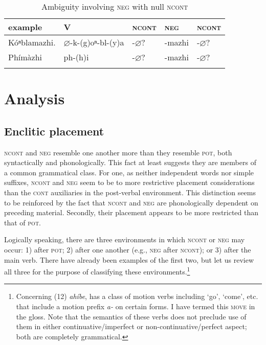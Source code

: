 \documentclass[output=paper]{LSP/langsci}
\begin{document}
\begin{table}
\caption{Ambiguity involving \textsc{neg} with null \textsc{ncont}} \label{tableambiguity}
\begin{tabular}[h!]{ l l l l l }
\lsptoprule
example & V & \textsc{ncont}	& \textsc{neg} & \textsc{ncont} \\
\midrule
Kóⁿblamazhi. & $\varnothing$-k-(g)oⁿ-bl-(y)a & -$\varnothing$? & -mazhi & -$\varnothing$? \\
Phímàzhi & ph-(h)i & -$\varnothing$? &  -mazhi & -$\varnothing$?  \\
\lspbottomrule
\end{tabular}
\end{table}

\section{Analysis}
\subsection{Enclitic placement}
\textsc{ncont} and \textsc{neg} resemble one another more than they resemble \textsc{pot}, both syntactically and phonologically. This fact at least suggests they are members of a common grammatical class. For one, as neither independent words nor simple suffixes, \textsc{ncont} and \textsc{neg} seem to be  to more restrictive placement considerations than the \textsc{cont} auxiliaries in the post-verbal environment. This distinction seems to be reinforced by the fact that \textsc{ncont} and \textsc{neg} are phonologically dependent on preceding material. Secondly, their placement appears to be more restricted than that of \textsc{pot}.

Logically speaking, there are three environments in which \textsc{ncont} or \textsc{neg} may occur: 1) after \textsc{pot}; 2) after one another (e.g., \textsc{neg} after \textsc{ncont}); or 3) after the main verb. There have already been examples of the first two, but let us review all three for the purpose of classifying these environments.\footnote{Concerning (12) \textit{ahíbe},  has a class of motion verbs including `go', `come', etc. that include a motion prefix \textit{a-} on certain forms. I have termed this \textsc{move} in the gloss. Note that the semantics of these verbs does not preclude use of them in either continuative/imperfect or non-continuative/perfect aspect; both are completely grammatical.}

\ea
  \ea 
 
\end{document}
